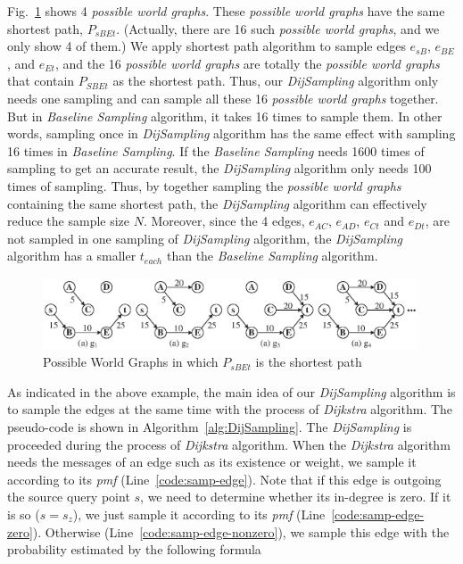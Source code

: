 \documentclass[runningheads,a4paper]{llncs}
\begin{document}
\begin{example}
\label{eg:imp-samp-adv}
Fig.~\ref{fig:imp-samp-adv} shows 4 \emph{possible world graphs}. These \emph{possible world graphs} have the same shortest path, $P_{sBEt}$. (Actually, there are 16 such \emph{possible world graphs}, and we only show 4 of them.) We apply shortest path algorithm to sample edges $e_{sB}$, $e_{BE}$, and $e_{Et}$, and the 16 \emph{possible world graphs} are totally the \emph{possible world graphs} that contain $P_{SBEt}$ as the shortest path. Thus, our \emph{DijSampling} algorithm only needs one sampling and can sample all these 16 \emph{possible world graphs} together. But in \emph{Baseline Sampling} algorithm, it takes 16 times to sample them.  In other words, sampling once in \emph{DijSampling} algorithm has the same effect with sampling 16 times in \emph{Baseline Sampling}. If the \emph{Baseline Sampling} needs 1600 times of sampling to get an accurate result, the \emph{DijSampling} algorithm only needs 100 times of sampling. Thus, by together sampling the \emph{possible world graphs} containing the same shortest path, the \emph{DijSampling} algorithm can effectively reduce the sample size $N$. Moreover, since the 4 edges, $e_{AC}$, $e_{AD}$, $e_{Ct}$ and $e_{Dt}$, are not sampled in one sampling of \emph{DijSampling} algorithm, the \emph{DijSampling} algorithm has a smaller $t_{each}$ than the \emph{Baseline Sampling} algorithm.

\begin{figure}[htbp]
\vspace{-0.6cm}
\label{fig:imp-samp-adv}
\centering
\includegraphics[width=0.99\textwidth]{fig-imp-sample-adv.eps}
\vspace{-0.3cm}
\caption{\small{Possible World Graphs in which $P_{sBEt}$ is the shortest path}}
\vspace{-0.4cm}
\end{figure}

\vspace{-0.3cm}
\end{example}

As indicated in the above example, the main idea of our \emph{DijSampling} algorithm is to sample the edges at the same time with the process of \emph{Dijkstra} algorithm. The pseudo-code is shown in Algorithm~\ref{alg:DijSampling}. The \emph{DijSampling} is proceeded during the process of \emph{Dijkstra} algorithm. When the \emph{Dijkstra} algorithm needs the messages of an edge such as its existence or weight, we sample it according to its \emph{pmf} (Line~\ref{code:samp-edge}). Note that if this edge is outgoing the source query point $s$, we need to determine whether its in-degree is zero. If it is so ($s=s_z$), we just sample it according to its \emph{pmf} (Line~\ref{code:samp-edge-zero}). Otherwise (Line~\ref{code:samp-edge-nonzero}), we sample this edge with the probability estimated by the following formula
\end{document}
